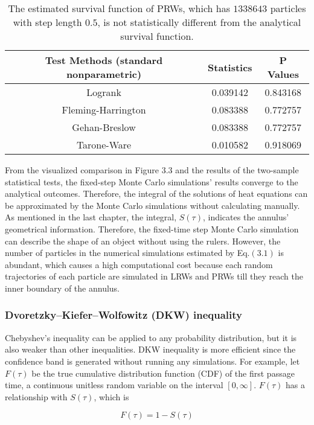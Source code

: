\begin{table}[h!]
  \centering
  \begin{tabular}{|c|c|c|}\hline
    Test Methods (standard nonparametric) & Statistics & P Values \\
    \hline
    Logrank & 0.039142 & 0.843168 \\
    \hline
    Fleming-Harrington & 0.083388 & 0.772757 \\
    \hline
    Gehan-Breslow & 0.083388 & 0.772757 \\
    \hline
    Tarone-Ware & 0.010582 & 0.918069 \\
    \hline
  \end{tabular}
  \caption{The estimated survival function of PRWs, which has
    $1338643$ particles with step length $0.5$, is not statistically
    different from the analytical survival function.}
\end{table}


From the visualized comparison in Figure $3.3$ and the results of the
two-sample statistical tests, the fixed-step Monte Carlo simulations'
results converge to the analytical outcomes. Therefore, the integral
of the solutions of heat equations can be approximated by the Monte
Carlo simulations without calculating manually. As mentioned in the
last chapter, the integral, $S(\tau)$, indicates the annulus'
geometrical information. Therefore, the fixed-time step Monte Carlo
simulation can describe the shape of an object without using the
rulers. However, the number of particles in the numerical simulations
estimated by Eq.$(3.1)$ is abundant, which causes a high computational
cost because each random trajectories of each particle are simulated
in LRWs and PRWs till they reach the inner boundary of the annulus. 


\subsubsection{Dvoretzky–Kiefer–Wolfowitz (DKW) inequality}

Chebyshev's inequality can be applied to any probability distribution,
but it is also weaker than other inequalities. DKW inequality is more
efficient since the confidence band is generated without running any
simulations. For example, let $F(\tau)$ be the true cumulative
distribution function (CDF) of the first passage time, a continuous unitless
random variable on the interval $[0, \infty]$. $F(\tau)$ has a
relationship with $S(\tau)$, which is

\begin{equation}
  F(\tau) = 1 - S(\tau)
\end{equation}

